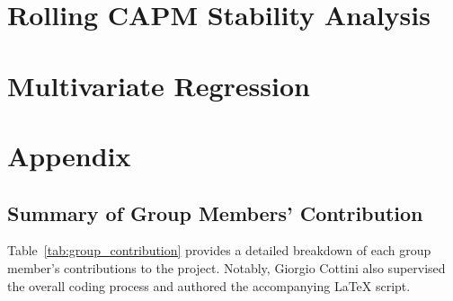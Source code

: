 \documentclass[12pt, openright, oneside]{report}
\begin{document}
\chapter{Rolling CAPM Stability Analysis}\label{chapter:rolling}


\chapter{Multivariate Regression}\label{chapter:multivariate}


\chapter*{Appendix}\label{chapter:appendix}


\section*{Summary of Group Members' Contribution}

Table~\ref{tab:group_contribution} provides a detailed breakdown of each group member's contributions to the project. 
Notably, Giorgio Cottini also supervised the overall coding process and authored the accompanying LaTeX script.\\
\end{document}
